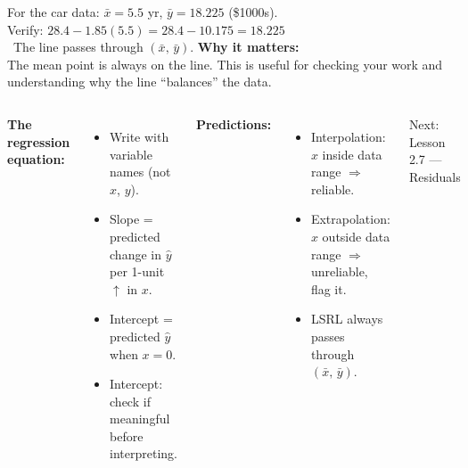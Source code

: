 \documentclass[aspectratio=169, 11pt]{beamer}
\begin{document}
\begin{frame}[t, plain]
  \vspace{0.3cm}
  \begin{columns}
      For the car data: $\bar{x} = 5.5$ yr, $\bar{y} = 18.225$ (\$1000s).\\[10pt]
      Verify: $28.4 - 1.85(5.5) = 28.4 - 10.175 = \mathbf{18.225}$ \\[6pt]
      \checkmark\ The line passes through $(\bar{x},\, \bar{y})$.
      \textbf{Why it matters:}\\[6pt]
      The mean point is always on the line. This is useful for checking your work and
      understanding why the line ``balances'' the data.
  \end{columns}
\end{frame}

\begin{frame}[t, plain]
  \vspace{0.3cm}
  \begin{columns}
      \textbf{The regression equation:}
      \begin{itemize}
        \item Write with variable names (not $x$, $y$).
        \item Slope = predicted change in $\hat{y}$ per 1-unit $\uparrow$ in $x$.
        \item Intercept = predicted $\hat{y}$ when $x = 0$.
        \item Intercept: check if meaningful before interpreting.
      \end{itemize}
      \textbf{Predictions:}
      \begin{itemize}
        \item Interpolation: $x$ inside data range $\Rightarrow$ reliable.
        \item Extrapolation: $x$ outside data range $\Rightarrow$ unreliable, flag it.
        \item LSRL always passes through $(\bar{x},\, \bar{y})$.
      \end{itemize}
      \vspace{6pt}
      \textcolor{goldacc}{\small Next: Lesson 2.7 --- Residuals}
  \end{columns}
\end{frame}
\end{document}

